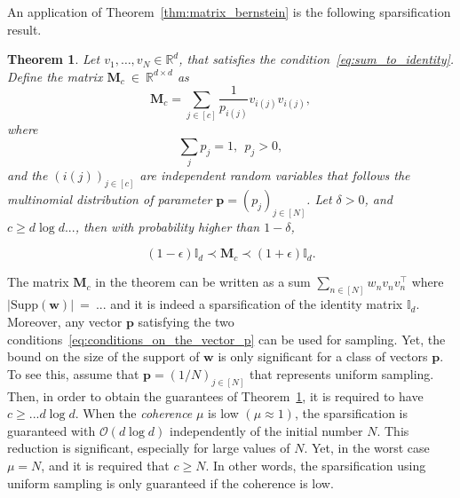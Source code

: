 \documentclass[twoside,11pt]{book}
\newtheorem{theorem}{Theorem}
\numberwithin{theorem}{chapter}
\numberwithin{definition}{chapter}
\numberwithin{proposition}{chapter}
\numberwithin{corollary}{chapter}
\numberwithin{example}{chapter}
\numberwithin{lemma}{chapter}
\DeclareMathOperator{\Tran}{\intercal}
\begin{document}


An application of Theorem~\ref{thm:matrix_bernstein} is the following sparsification result.

\begin{theorem}\label{thm:matrix_bernstein_identity_sparsification}
Let $v_{1}, \dots, v_{N} \in \mathbb{R}^{d}$, that satisfies the condition~\eqref{eq:sum_to_identity}. Define the matrix $\bm{M}_{c}~\in~\mathbb{R}^{d\times d}$ as
\begin{equation}
\bm{M}_{c} = \sum\limits_{j \in [c]} \frac{1}{p_{i(j)}}v_{i(j)}v_{i(j)},
\end{equation} 
where
\begin{equation}\label{eq:conditions_on_the_vector_p}
\sum\limits_{j} p_{j} = 1, \:\: p_{j}>0,
\end{equation}
and the $(i(j))_{j \in [c]}$ are independent random variables that follows the multinomial distribution of parameter $\bm{p} = (p_{j})_{j \in [N]}$. Let $\delta >0$, and $c \geq d \log d ...$, then with probability higher than $1-\delta$,

\begin{equation}
 (1-\epsilon) \mathbb{I}_{d} \prec \bm{M}_{c} \prec (1+\epsilon) \mathbb{I}_{d}.
\end{equation}

\end{theorem}

The matrix $\bm{M}_{c}$ in the theorem can be written as a sum $\displaystyle \sum\limits_{n \in [N]}w_{n}v_{n}v_{n}^{\Tran}$ where $|\mathrm{Supp}(\bm{w})|~=~...$ and it is indeed a sparsification of the identity matrix $\mathbb{I}_{d}$. Moreover, any vector $\bm{p}$ satisfying the two conditions~\eqref{eq:conditions_on_the_vector_p} can be used for sampling. Yet, the bound on the size of the support of $\bm{w}$ is only significant for a class of vectors $\bm{p}$. To see this, assume that $\bm{p} = (1/N)_{j \in [N]}$ that represents uniform sampling. Then, in order to obtain the guarantees of Theorem~\ref{thm:matrix_bernstein_identity_sparsification}, it is required to have  $c \geq ... d \log d $. When the \emph{coherence} $\mu$ is low $(\mu \approx 1)$, the sparsification is guaranteed with $\mathcal{O}(d \log d)$ independently of the initial number $N$. This reduction is significant, especially for large values of $N$. Yet, in the worst case $\mu = N$, and it is required that $c \geq N$. In other words, the sparsification using uniform sampling is only guaranteed if the coherence is low.
\end{document}
